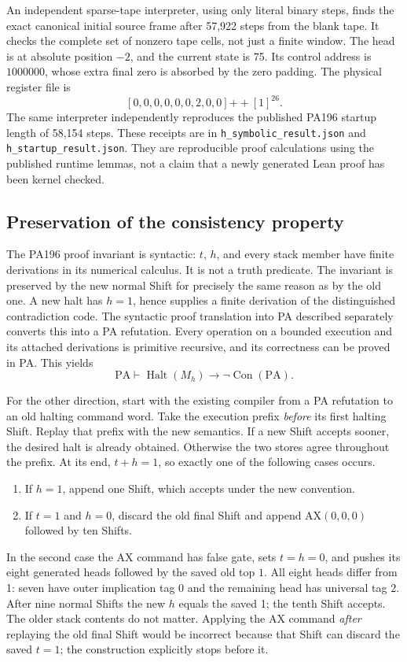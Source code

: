 An independent sparse-tape interpreter, using only literal binary steps,
finds the exact canonical initial source frame after 57,922 steps from the
blank tape.  It checks the complete set of nonzero tape cells, not just a
finite window.  The head is at absolute position $-2$, and the current state
is 75.  Its control address is $1000000$, whose extra final zero is absorbed
by the zero padding.  The physical register file is
\[
 [0,0,0,0,0,0,2,0,0]\mathbin{+\!+}[1]^{26}.
\]
The same interpreter independently reproduces the published PA196 startup
length of 58,154 steps.  These receipts are in
\texttt{h\_symbolic\_result.json} and \texttt{h\_startup\_result.json}.
They are reproducible proof calculations using the published runtime lemmas,
not a claim that a newly generated Lean proof has been kernel checked.

\subsection{Preservation of the consistency property}
The PA196 proof invariant is syntactic: $t$, $h$, and every stack member have
finite derivations in its numerical calculus.  It is not a truth predicate.
The invariant is preserved by the new normal Shift for precisely the same
reason as by the old one.  A new halt has $h=1$, hence supplies a finite
derivation of the distinguished contradiction code.  The syntactic proof
translation into PA described separately converts this into a PA refutation.
Every operation on a bounded execution and its attached derivations is
primitive recursive, and its correctness can be proved in PA.  This yields
\[
  \mathrm{PA}\vdash
  \operatorname{Halt}(M_h)\longrightarrow\neg\operatorname{Con}(\mathrm{PA}).
\]

For the other direction, start with the existing compiler from a PA
refutation to an old halting command word.  Take the execution prefix
\emph{before} its first halting Shift.  Replay that prefix with the new
semantics.  If a new Shift accepts sooner, the desired halt is already
obtained.  Otherwise the two stores agree throughout the prefix.  At its
end, $t+h=1$, so exactly one of the following cases occurs.
\begin{enumerate}
\item If $h=1$, append one Shift, which accepts under the new convention.
\item If $t=1$ and $h=0$, discard the old final Shift and append
      $\mathrm{AX}(0,0,0)$ followed by ten Shifts.
\end{enumerate}
In the second case the AX command has false gate, sets $t=h=0$, and pushes
its eight generated heads followed by the saved old top $1$.  All eight
heads differ from 1: seven have outer implication tag 0 and the remaining
head has universal tag 2.  After nine normal Shifts the new $h$ equals the
saved 1; the tenth Shift accepts.  The older stack contents do not matter.
Applying the AX command \emph{after} replaying the old final Shift would be
incorrect because that Shift can discard the saved $t=1$; the construction
explicitly stops before it.

